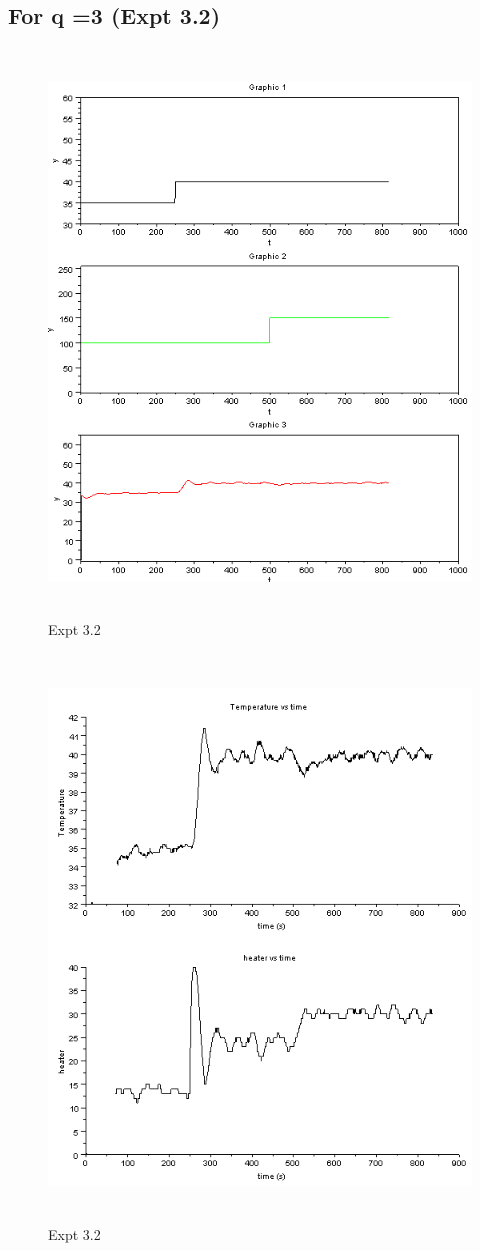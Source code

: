 \subsection{For q =3 (Expt 3.2) }
\begin{figure}[H]
  \includegraphics[width=12cm, height=15cm]{mpc/3_2.PNG}
  \caption{Expt 3.2}
\end{figure}
\begin{figure}[H]
  \includegraphics[width=12cm, height=15cm]{mpc/3_2_heater_final.png}
  \caption{Expt 3.2}
\end{figure}


